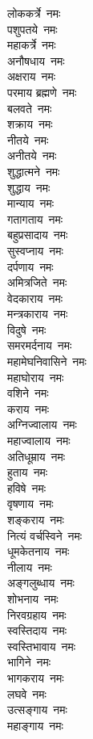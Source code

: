 \begin{multicols}{2}
\begin{flushleft}
लोककर्त्रे~नमः\\
पशुपतये~नमः\\
महाकर्त्रे~नमः\hfill{}\\
अनौषधाय~नमः\\
अक्षराय~नमः\\
परमाय ब्रह्मणे~नमः\\
बलवते~नमः\\
शक्राय~नमः\\
नीतये~नमः\\
अनीतये~नमः\\
शुद्धात्मने~नमः\\
शुद्धाय~नमः\\
मान्याय~नमः\hfill{}\\
गतागताय~नमः\\
बहुप्रसादाय~नमः\\
सुस्वप्नाय~नमः\\
दर्पणाय~नमः\\
अमित्रजिते~नमः\\
वेदकाराय~नमः\\
मन्त्रकाराय~नमः\\
विदुषे~नमः\\
समरमर्दनाय~नमः\\
महामेघनिवासिने~नमः\hfill{}\\
महाघोराय~नमः\\
वशिने~नमः\\
कराय~नमः\\
अग्निज्वालाय~नमः\\
महाज्वालाय~नमः\\
अतिधूम्राय~नमः\\
हुताय~नमः\\
हविषे~नमः\\
वृषणाय~नमः\\
शङ्कराय~नमः\hfill{}\\
नित्यं वर्चस्विने~नमः\\
धूमकेतनाय~नमः\\
नीलाय~नमः\\
अङ्गलुब्धाय~नमः\\
शोभनाय~नमः\\
निरवग्रहाय~नमः\\
स्वस्तिदाय~नमः\\
स्वस्तिभावाय~नमः\\
भागिने~नमः\\
भागकराय~नमः\hfill{}\\
लघवे~नमः\\
उत्सङ्गाय~नमः\\
महाङ्गाय~नमः\\

\end{flushleft}
\end{multicols}
